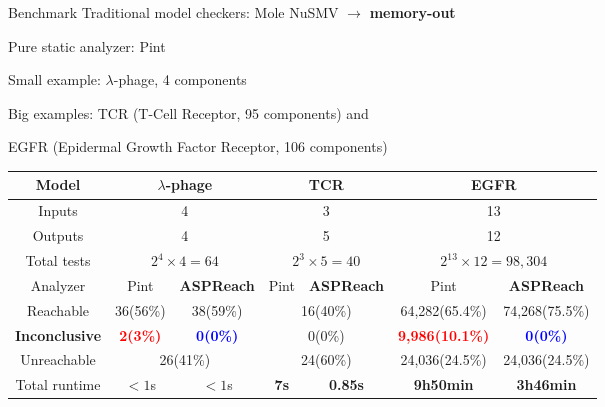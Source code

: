 \documentclass[8pt]{beamer}
\begin{document}
\begin{frame}{Benchmark}
Traditional model checkers: Mole NuSMV $\to$ \textbf{memory-out}

Pure static analyzer: Pint \cite{folschette2015}

Small example: $\lambda$-phage, 4 components

Big examples: TCR (T-Cell Receptor, 95 components) and

EGFR (Epidermal Growth Factor Receptor, 106 components)

\small
\begin{table}[t]
    \centering
    \begin{tabular}{|c|c|c|c|c|c|c|}
    \hline
  	Model	&\multicolumn{2}{c|}{$\lambda$-phage}	&	  \multicolumn{2}{c|}{TCR} & \multicolumn{2}{c|}{EGFR}  \\
    \hline
    Inputs&\multicolumn{2}{c|}{4}	&	  \multicolumn{2}{c|}{3} & \multicolumn{2}{c|}{13}\\
    \hline
    Outputs&\multicolumn{2}{c|}{4} &	  \multicolumn{2}{c|}{5} & \multicolumn{2}{c|}{12} \\
    \hline
    Total tests&\multicolumn{2}{c|}{$2^4\times 4=64$} & \multicolumn{2}{c|}{$2^3\times 5=40$} & \multicolumn{2}{c|}{$2^{13}\times 12=98,304$}\\
    \hline
    Analyzer  &  Pint       &\textbf{ASPReach}    &  Pint       &\textbf{ASPReach}   &  Pint       &\textbf{ASPReach}             \\
    \hline
    Reachable    & 36(56\%)& 38(59\%)   &  \multicolumn{2}{c|}{16(40\%)}  & 64,282(65.4\%)&74,268(75.5\%)\\
    \hline
    \textbf{Inconclusive} & \textcolor{red}{\textbf{2(3\%)}}&\textcolor{blue}{\textbf{0(0\%)}}& \multicolumn{2}{c|}{0(0\%)}    &\textcolor{red}{\textbf{9,986(10.1\%)}}&\textcolor{blue}{\textbf{0(0\%)}}  \\
    \hline
    Unreachable     &  \multicolumn{2}{c|}{26(41\%)} &  \multicolumn{2}{c|}{24(60\%)} &24,036(24.5\%)&24,036(24.5\%)\\
    \hline
    Total runtime &  $<1$s       &  $<1$s &  \textbf{7s}       &  \textbf{0.85s}        & \textbf{9h50min}              & \textbf{3h46min}      \\
    \hline
    \end{tabular}
\end{table}


\end{frame}
\end{document}
